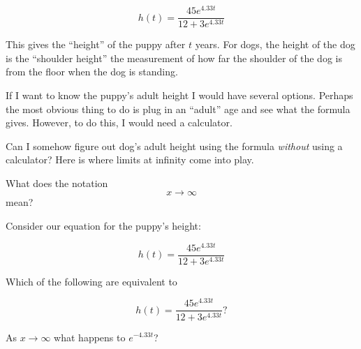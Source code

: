 \documentclass{ximera}
\begin{document}
\[
h(t) = \frac{45 e^{4.33 t}}{12+3 e^{4.33 t}}
\]

This gives the ``height'' of the puppy after $t$ years. For dogs, the
height of the dog is the ``shoulder height'' the measurement of how
far the shoulder of the dog is from the floor when the dog is
standing.

If I want to know the puppy's adult height I would have several
options. Perhaps the most obvious thing to do is plug in an ``adult''
age and see what the formula gives. However, to do this, I would need
a calculator.

Can I somehow figure out dog's adult height using the formula
\emph{without} using a calculator? Here is where limits at infinity
come into play.


\begin{question}
What does the notation
\[
x\to \infty
\]
mean?
\begin{multipleChoice}
\end{multipleChoice}
\end{question}

Consider our equation for the puppy's height:


\[
h(t) = \frac{45 e^{4.33 t}}{12+3 e^{4.33 t}}
\]

\begin{question}
Which of the following are equivalent to 

\[
h(t) = \frac{45 e^{4.33 t}}{12+3 e^{4.33 t}}?
\]

\begin{multipleChoice}
\end{multipleChoice}
\end{question}

\begin{question}
As $x\to \infty$ what happens to $e^{-4.33t}$?
\begin{multipleChoice}
\end{multipleChoice}
\end{question}
\end{document}
